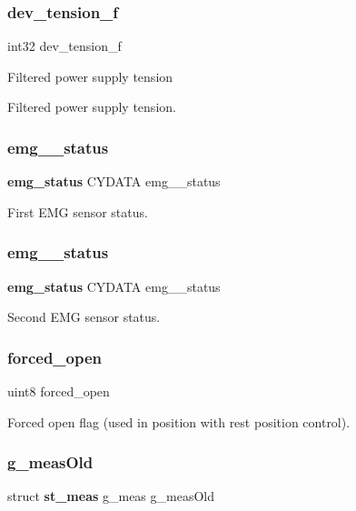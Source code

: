 \subsubsection{dev\+\_\+tension\+\_\+f}
{\footnotesize\ttfamily int32 dev\+\_\+tension\+\_\+f}

Filtered power supply tension

Filtered power supply tension. \mbox{\label{globals_8h_a433230c4343adf14967e6f4f9082b199}} 
\subsubsection{emg\+\_\+\_\+status}
{\footnotesize\ttfamily \textbf{ emg\+\_\+status} C\+Y\+D\+A\+TA emg\+\_\+\_\+status}

First E\+MG sensor status. \mbox{\label{globals_8h_a7eef8180f636a73854d52b58e2be4e51}} 
\subsubsection{emg\+\_\+\_\+status}
{\footnotesize\ttfamily \textbf{ emg\+\_\+status} C\+Y\+D\+A\+TA emg\+\_\+\_\+status}

Second E\+MG sensor status. \mbox{\label{globals_8h_a0f13b80a0c329fa3176eb1e72ef36fb8}} 
\subsubsection{forced\+\_\+open}
{\footnotesize\ttfamily uint8 forced\+\_\+open}

Forced open flag (used in position with rest position control). \mbox{\label{globals_8h_a47c3980e6bddec492ca4315e36602ba0}} 
\subsubsection{g\+\_\+meas\+Old}
{\footnotesize\ttfamily struct \textbf{ st\+\_\+meas} g\+\_\+meas g\+\_\+meas\+Old}

